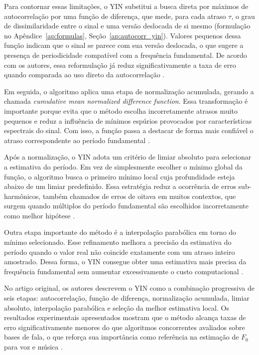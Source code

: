 Para contornar essas limitações, o YIN substitui a busca direta por máximos de autocorrelação por uma função de diferença, que mede, para cada atraso \(\tau\), o grau de dissimilaridade entre o sinal e uma versão deslocada de si mesmo (formulação no Apêndice~\ref{ap:formulas}, Seção~\ref{ap:autocorr_yin}). Valores pequenos dessa função indicam que o sinal se parece com sua versão deslocada, o que sugere a presença de periodicidade compatível com a frequência fundamental. De acordo com os autores, essa reformulação já reduz significativamente a taxa de erro quando comparada ao uso direto da autocorrelação \cite{decheveigne2002yin}.

Em seguida, o algoritmo aplica uma etapa de normalização acumulada, gerando a chamada \textit{cumulative mean normalized difference function}. Essa transformação é importante porque evita que o método escolha incorretamente atrasos muito pequenos e reduz a influência de mínimos espúrios provocados por características espectrais do sinal. Com isso, a função passa a destacar de forma mais confiável o atraso correspondente ao período fundamental \cite{decheveigne2002yin}.

Após a normalização, o YIN adota um critério de limiar absoluto para selecionar a estimativa do período. Em vez de simplesmente escolher o mínimo global da função, o algoritmo busca o primeiro mínimo local cuja profundidade esteja abaixo de um limiar predefinido. Essa estratégia reduz a ocorrência de erros sub-harmônicos, também chamados de erros de oitava em muitos contextos, que surgem quando múltiplos do período fundamental são escolhidos incorretamente como melhor hipótese \cite{decheveigne2002yin}.

Outra etapa importante do método é a interpolação parabólica em torno do mínimo selecionado. Esse refinamento melhora a precisão da estimativa do período quando o valor real não coincide exatamente com um atraso inteiro amostrado. Dessa forma, o YIN consegue obter uma estimativa mais precisa da frequência fundamental sem aumentar excessivamente o custo computacional \cite{decheveigne2002yin}.

No artigo original, os autores descrevem o YIN como a combinação progressiva de seis etapas: autocorrelação, função de diferença, normalização acumulada, limiar absoluto, interpolação parabólica e seleção da melhor estimativa local. Os resultados experimentais apresentados mostram que o método alcança taxas de erro significativamente menores do que algoritmos concorrentes avaliados sobre bases de fala, o que reforça sua importância como referência na estimação de \(F_0\) para voz e música \cite{decheveigne2002yin}.

